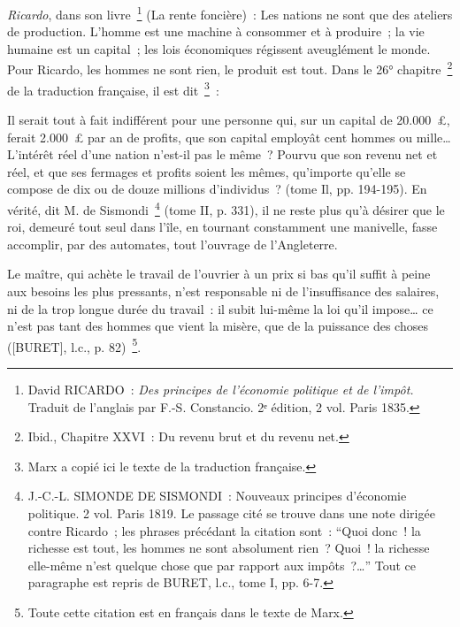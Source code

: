 \documentclass[french,twoside]{book} %
\newenvironment{quoteblock}%
  {\begin{quoting}}
  {\end{quoting}}
\newenvironment{quotebar}{%
    \def\FrameCommand{{\color{rubric!10!}\vrule width 0.5em} \hspace{0.9em}}%
    \def\OuterFrameSep{\itemsep} %
    \MakeFramed {\advance\hsize-\width \FrameRestore}
  }%
  {%
    \endMakeFramed
  }
\renewenvironment{quoteblock}%
  {%
    \savenotes
    \setstretch{0.9}
    \normalfont
    \begin{quotebar}
  }
  {%
    \end{quotebar}
    \spewnotes
  }
\begin{document}
\noindent \emph{Ricardo}, dans son livre \footnote{David RICARDO :\emph{ Des principes de l’économie politique et de l’impôt.} Traduit de l’anglais par F.-S. Constancio. 2ᵉ édition, 2 vol. Paris 1835.} (La rente foncière) : Les nations ne sont que des ateliers de production. L’homme est une machine à consommer et à produire ; la vie humaine est un capital ; les lois économiques régissent aveuglément le monde. Pour Ricardo, les hommes ne sont rien, le produit est tout. Dans le 26° chapitre \footnote{Ibid., Chapitre XXVI : Du revenu brut et du revenu net.} de la traduction française, il est dit \footnote{Marx a copié ici le texte de la traduction française.} :\par

\begin{quoteblock}
 \noindent Il serait tout à fait indifférent pour une personne qui, sur un capital de 20.000 £, ferait 2.000 £ par an de profits, que son capital employât cent hommes ou mille… L’intérêt réel d’une nation n’est-il pas le même ? Pourvu que son revenu net et réel, et que ses fermages et profits soient les mêmes, qu’importe qu’elle se compose de dix ou de douze millions d’individus ? (tome Il, pp. 194-195). En vérité, dit M. de Sismondi \footnote{J.-C.-L. SIMONDE DE SISMONDI : Nouveaux principes d’économie politique. 2 vol. Paris 1819. Le passage cité se trouve dans une note dirigée contre Ricardo ; les phrases précédant la citation sont : “Quoi donc ! la richesse est tout, les hommes ne sont absolument rien ? Quoi ! la richesse elle-même n’est quelque chose que par rapport aux impôts ?…” Tout ce paragraphe est repris de BURET, l.c., tome I, pp. 6-7.} (tome II, p. 331), il ne reste plus qu’à désirer que le roi, demeuré tout seul dans l’île, en tournant constamment une manivelle, fasse accomplir, par des automates, tout l’ouvrage de l’Angleterre.\par
 Le maître, qui achète le travail de l’ouvrier à un prix si bas qu’il suffit à peine aux besoins les plus pressants, n’est responsable ni de l’insuffisance des salaires, ni de la trop longue durée du travail : il subit lui-même la loi qu’il impose… ce n’est pas tant des hommes que vient la misère, que de la puissance des choses ([BURET], l.c., p. 82) \footnote{Toute cette citation est en français dans le texte de Marx.}.\par

\end{quoteblock}
\end{document}
